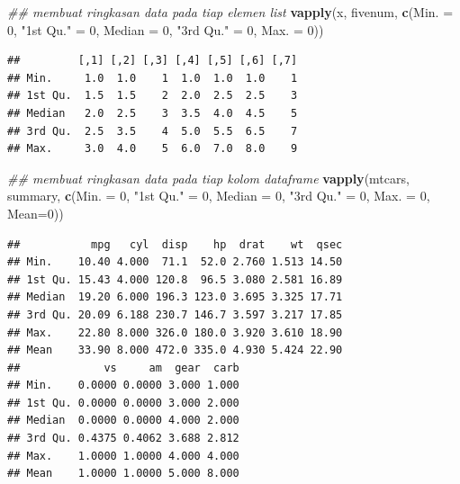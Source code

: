 \documentclass[]{book}
\newenvironment{Shaded}{\begin{snugshade}}{\end{snugshade}}
\newcommand{\CommentTok}[1]{\textcolor[rgb]{0.56,0.35,0.01}{\textit{#1}}}
\newcommand{\DataTypeTok}[1]{\textcolor[rgb]{0.13,0.29,0.53}{#1}}
\newcommand{\DecValTok}[1]{\textcolor[rgb]{0.00,0.00,0.81}{#1}}
\newcommand{\KeywordTok}[1]{\textcolor[rgb]{0.13,0.29,0.53}{\textbf{#1}}}
\newcommand{\NormalTok}[1]{#1}
\newcommand{\StringTok}[1]{\textcolor[rgb]{0.31,0.60,0.02}{#1}}
\theoremstyle{definition}
\theoremstyle{definition}
\theoremstyle{definition}
\theoremstyle{remark}
\begin{document}
\begin{Shaded}
\begin{Highlighting}[]
\CommentTok{## membuat ringkasan data pada tiap elemen list}
\KeywordTok{vapply}\NormalTok{(x, fivenum,}
       \KeywordTok{c}\NormalTok{(}\DataTypeTok{Min. =} \DecValTok{0}\NormalTok{, }\StringTok{"1st Qu."}\NormalTok{ =}\StringTok{ }\DecValTok{0}\NormalTok{, }
         \DataTypeTok{Median =} \DecValTok{0}\NormalTok{, }\StringTok{"3rd Qu."}\NormalTok{ =}\StringTok{ }\DecValTok{0}\NormalTok{, }\DataTypeTok{Max. =} \DecValTok{0}\NormalTok{))}
\end{Highlighting}
\end{Shaded}

\begin{verbatim}
##         [,1] [,2] [,3] [,4] [,5] [,6] [,7]
## Min.     1.0  1.0    1  1.0  1.0  1.0    1
## 1st Qu.  1.5  1.5    2  2.0  2.5  2.5    3
## Median   2.0  2.5    3  3.5  4.0  4.5    5
## 3rd Qu.  2.5  3.5    4  5.0  5.5  6.5    7
## Max.     3.0  4.0    5  6.0  7.0  8.0    9
\end{verbatim}

\begin{Shaded}
\begin{Highlighting}[]
\CommentTok{## membuat ringkasan data pada tiap kolom dataframe}
\KeywordTok{vapply}\NormalTok{(mtcars, summary,}
       \KeywordTok{c}\NormalTok{(}\DataTypeTok{Min. =} \DecValTok{0}\NormalTok{, }\StringTok{"1st Qu."}\NormalTok{ =}\StringTok{ }\DecValTok{0}\NormalTok{, }
         \DataTypeTok{Median =} \DecValTok{0}\NormalTok{, }\StringTok{"3rd Qu."}\NormalTok{ =}\StringTok{ }\DecValTok{0}\NormalTok{, }\DataTypeTok{Max. =} \DecValTok{0}\NormalTok{, }\DataTypeTok{Mean=}\DecValTok{0}\NormalTok{))}
\end{Highlighting}
\end{Shaded}

\begin{verbatim}
##           mpg   cyl  disp    hp  drat    wt  qsec
## Min.    10.40 4.000  71.1  52.0 2.760 1.513 14.50
## 1st Qu. 15.43 4.000 120.8  96.5 3.080 2.581 16.89
## Median  19.20 6.000 196.3 123.0 3.695 3.325 17.71
## 3rd Qu. 20.09 6.188 230.7 146.7 3.597 3.217 17.85
## Max.    22.80 8.000 326.0 180.0 3.920 3.610 18.90
## Mean    33.90 8.000 472.0 335.0 4.930 5.424 22.90
##             vs     am  gear  carb
## Min.    0.0000 0.0000 3.000 1.000
## 1st Qu. 0.0000 0.0000 3.000 2.000
## Median  0.0000 0.0000 4.000 2.000
## 3rd Qu. 0.4375 0.4062 3.688 2.812
## Max.    1.0000 1.0000 4.000 4.000
## Mean    1.0000 1.0000 5.000 8.000
\end{verbatim}
\end{document}
